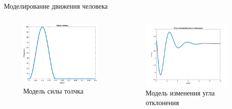 \documentclass[10pt]{beamer}
\begin{document}
\begin{frame}{Моделирование движения человека}
	\begin{columns}
		\begin{figure}[h!]
			\includegraphics[width=1\linewidth]{images/pushes_my.png}
			\caption{Модель силы толчка}
		\end{figure}
		\begin{figure}[h!]
			\includegraphics[width=1\linewidth]{images/degrees.png}
			\caption{Модель изменения угла отклонения}
		\end{figure}
	\end{columns}
\end{frame}
\end{document}

